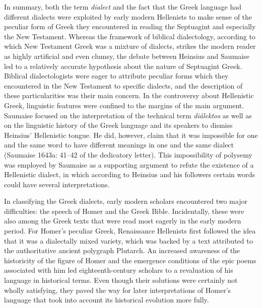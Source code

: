\documentclass[12pt]{article}
\makeatletter
\renewcommand\subsection{\@startsection{subsection}{2}{0.1972in}{0.1665in}{0.0835in}{\normalfont\normalsize\fontsize{12pt}{14.4pt}\selectfont\rmfamily\bfseries}}
\newenvironment{styleStandard}{\renewcommand\baselinestretch{1.25}\setlength\leftskip{0in}\setlength\rightskip{0in}\setlength\parindent{0.1972in}\setlength\parfillskip{0pt plus 1fil}\setlength\parskip{0in plus 1pt}\writerlistparindent\writerlistleftskip\leavevmode\normalfont\normalsize\writerlistlabel\ignorespaces}{\unskip\vspace{0in plus 1pt}\par}
\newcommand\writerlistleftskip{}
\newcommand\writerlistparindent{}
\newcommand\writerlistlabel{}
\makeatother
\begin{document}
\begin{styleStandard}
In summary, both the term \textit{dialect} and the fact that the Greek language had different dialects were exploited by early modern Hellenists to make sense of the peculiar form of Greek they encountered in reading the Septuagint and especially the New Testament. Whereas the framework of biblical dialectology, according to which New Testament Greek was a mixture of dialects, strikes the modern reader as highly artificial and even clumsy, the debate between Heinsius and Saumaise led to a relatively accurate hypothesis about the nature of Septuagint Greek. Biblical dialectologists were eager to attribute peculiar forms which they encountered in the New Testament to specific dialects, and the description of these particularities was their main concern. In the controversy about Hellenistic Greek, linguistic features were confined to the margins of the main argument. Saumaise focused on the interpretation of the technical term \textit{diálektos} as well as on the linguistic history of the Greek language and its speakers to dismiss Heinsius’ Hellenistic tongue. He did, however, claim that it was impossible for one and the same word to have different meanings in one and the same dialect (Saumaise 1643a: 41–42 of the dedicatory letter). This impossibility of polysemy was employed by Saumaise as a supporting argument to refute the existence of a Hellenistic dialect, in which according to Heinsius and his followers certain words could have several interpretations.
\end{styleStandard}

\subsection{Conclusion}
\hypertarget{Toc19704833}{}\begin{styleStandard}
In classifying the Greek dialects, early modern scholars encountered two major difficulties: the speech of Homer and the Greek Bible. Incidentally, these were also among the Greek texts that were read most eagerly in the early modern period. For Homer’s peculiar Greek, Renaissance Hellenists first followed the idea that it was a dialectally mixed variety, which was backed by a text attributed to the authoritative ancient polygraph Plutarch. An increased awareness of the historicity of the figure of Homer and the emergence conditions of the epic poems associated with him led eighteenth-century scholars to a revaluation of his language in historical terms. Even though their solutions were certainly not wholly satisfying, they paved the way for later interpretations of Homer’s language that took into account its historical evolution more fully.
\end{styleStandard}
\end{document}
